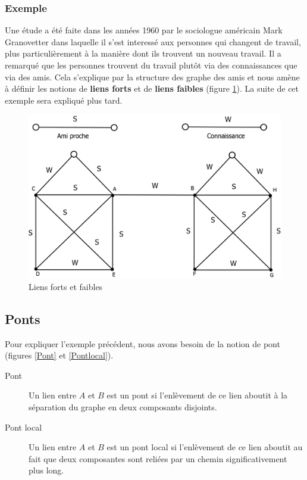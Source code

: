 \subsubsection*{Exemple}
Une étude a été faite dans les années 1960 par le sociologue américain Mark Granovetter dans laquelle il s'est interessé aux personnes qui changent de travail, plus particulièrement à la manière dont ils trouvent un nouveau travail. Il a remarqué que les personnes trouvent du travail plutôt via des connaissances que via des amis. Cela s'explique par la structure des graphe des amis et nous amène à définir les notions de \textbf{liens forts} et de \textbf{liens faibles} (figure \ref{liens_forts_et_faibles}). La suite de cet exemple sera expliqué plus tard.\\
	\begin{figure}[!h]
	\center
	\includegraphics[scale=0.4]{images/18_liens_forts_et_faibles.png}
	\caption{\label{liens_forts_et_faibles} Liens forts et faibles}
	\end{figure}

    
\subsection{Ponts}
Pour expliquer l'exemple précédent, nous avons besoin de la notion de pont (figures \ref{Pont} et \ref{Pontlocal}).
	\begin{description}
	\item[Pont] Un lien entre $A$ et $B$ est un pont si l'enlèvement de ce lien aboutit à la séparation du graphe en deux composants disjoints.
    \item[Pont local] Un lien entre $A$ et $B$ est un pont local si l'enlèvement de ce lien aboutit au fait que deux composantes sont reliées par un chemin significativement plus long.
    \end{description}
    
